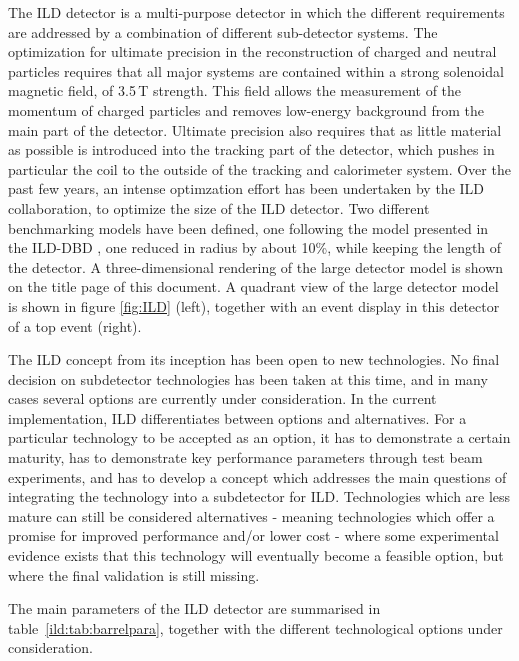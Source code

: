 \documentclass[%
 amsmath,amssymb,
 aps,
 longbibliography,
]{revtex4-1}
\begin{document}
The ILD detector is a multi-purpose detector in which the different requirements are addressed by a combination of different sub-detector systems. The optimization for ultimate precision in the reconstruction of charged and neutral particles requires that all major systems are contained within a strong solenoidal magnetic field, of 3.5\,T strength. This field allows the measurement of the momentum of charged particles and removes low-energy background from the main part of the detector. Ultimate precision also requires that as little material as possible is introduced into the tracking part of the detector, which pushes in particular the coil to the outside of the tracking and calorimeter system. Over the past few years, an intense optimzation effort has been undertaken by the ILD collaboration, to optimize the size of the ILD detector. Two different benchmarking models have been defined, one following the model presented in the ILD-DBD \cite{ild-dbd}, one reduced in radius by about 10\%, while keeping the length of the detector.  A three-dimensional rendering of the large detector model is shown on the title page of this document.
A quadrant view of the large detector model is shown in figure \ref{fig:ILD} (left), together with an event display in this detector of a top event (right).

The ILD concept from its inception has been open to new technologies. 
No final decision on subdetector technologies has been taken at this time, and in many cases several options are currently under consideration. In the current implementation, ILD differentiates between options and alternatives. 
For a particular technology to be accepted as an option, it has to demonstrate a certain maturity, has to demonstrate key performance parameters through test beam experiments, and has to develop a concept which addresses the main questions of integrating the technology into a subdetector for ILD. Technologies which are less mature can still be considered alternatives - meaning technologies which offer a promise for improved performance and/or lower cost - where some experimental evidence exists that this technology will eventually become a feasible option, but where the final validation is still missing. 

The main parameters of the ILD detector are summarised in table~\ref{ild:tab:barrelpara}, together with the different technological options under consideration. 
\end{document}
